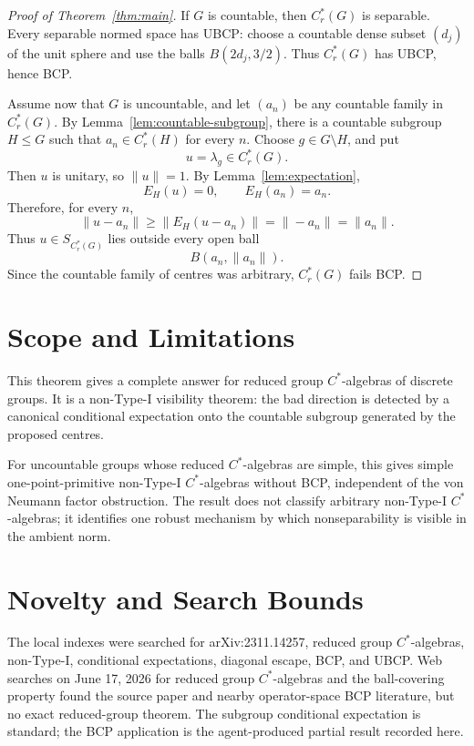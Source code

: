 \documentclass[11pt]{article}
\newcommand{\Cr}{C^*_r}
\begin{document}
\begin{proof}[Proof of Theorem~\ref{thm:main}]
If \(G\) is countable, then \(\Cr(G)\) is separable.  Every separable normed
space has UBCP: choose a countable dense subset \((d_j)\) of the unit sphere
and use the balls \(B(2d_j,3/2)\).  Thus \(\Cr(G)\) has UBCP, hence BCP.

Assume now that \(G\) is uncountable, and let \((a_n)\) be any countable
family in \(\Cr(G)\).  By Lemma~\ref{lem:countable-subgroup}, there is a
countable subgroup \(H\le G\) such that \(a_n\in\Cr(H)\) for every \(n\).
Choose \(g\in G\setminus H\), and put
\[
        u=\lambda_g\in\Cr(G).
\]
Then \(u\) is unitary, so \(\|u\|=1\).  By Lemma~\ref{lem:expectation},
\[
        E_H(u)=0,\qquad E_H(a_n)=a_n.
\]
Therefore, for every \(n\),
\[
        \|u-a_n\|
        \ge
        \|E_H(u-a_n)\|
        =
        \|-a_n\|
        =
        \|a_n\|.
\]
Thus \(u\in S_{\Cr(G)}\) lies outside every open ball
\[
        B(a_n,\|a_n\|).
\]
Since the countable family of centres was arbitrary, \(\Cr(G)\) fails BCP.
\end{proof}

\section*{Scope and Limitations}

This theorem gives a complete answer for reduced group \(C^*\)-algebras of
discrete groups.  It is a non-Type-I visibility theorem: the bad direction is
detected by a canonical conditional expectation onto the countable subgroup
generated by the proposed centres.

For uncountable groups whose reduced \(C^*\)-algebras are simple, this gives
simple one-point-primitive non-Type-I \(C^*\)-algebras without BCP, independent
of the von Neumann factor obstruction.  The result does not classify arbitrary
non-Type-I \(C^*\)-algebras; it identifies one robust mechanism by which
nonseparability is visible in the ambient norm.

\section*{Novelty and Search Bounds}

The local indexes were searched for arXiv:2311.14257, reduced group
\(C^*\)-algebras, non-Type-I, conditional expectations, diagonal escape,
BCP, and UBCP.  Web searches on June 17, 2026 for reduced group
\(C^*\)-algebras and the ball-covering property found the source paper and
nearby operator-space BCP literature, but no exact reduced-group theorem.
The subgroup conditional expectation is standard; the BCP application is the
agent-produced partial result recorded here.
\end{document}
